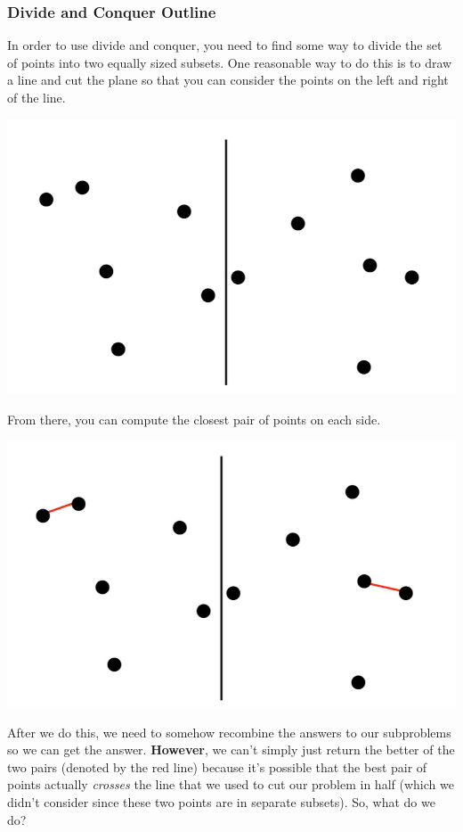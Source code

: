 \documentclass[letterpaper]{article}
\begin{document}
\subsubsection{Divide and Conquer Outline}
In order to use divide and conquer, you need to find some way to divide the set of points into two equally sized subsets. One reasonable way to do this is to draw a line and cut the plane so that you can consider the points on the left and right of the line. 
\begin{center}
    \includegraphics[scale=0.2]{assets/closest_pts_1.png}
\end{center}
From there, you can compute the closest pair of points on each side. 
\begin{center}
    \includegraphics[scale=0.2]{assets/closest_pts_2.png}
\end{center}
After we do this, we need to somehow recombine the answers to our subproblems so we can get the answer. \textbf{However}, we can't simply just return the better of the two pairs (denoted by the red line) because it's possible that the best pair of points actually \emph{crosses} the line that we used to cut our problem in half (which we didn't consider since these two points are in separate subsets). So, what do we do? 
\end{document}
